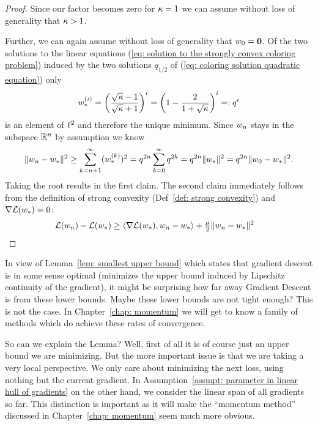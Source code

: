 \begin{proof}
	Since our factor becomes zero for \(\kappa=1\) we can assume without loss
	of generality that \(\kappa>1\).
	
	Further, we can again assume without loss of generality that
	\(w_0=\mathbf{0}\).  Of the two solutions to the linear equations
	(\ref{eq: solution to the strongly convex coloring problem}) induced by the
	two solutions \(q_{1/2}\) of (\ref{eq: coloring solution quadratic equation})
	only
	\begin{align*}
		w_*^{(i)} = \left(\frac{\sqrt{\kappa}-1}{\sqrt{\kappa}+1}\right)^i
		= \left(1 - \frac{2}{1+\sqrt{\kappa}}\right)^i =: q^i
	\end{align*}
	is an element of \(\ell^{2}\) and therefore the unique minimum. Since 
	\(w_n\) stays in the subspace \(\mathbb{R}^n\) by assumption we know
	\begin{align*}
		\|w_n -w_*\|^2
		\ge \sum_{k=n+1}^\infty (w_*^{(k)})^2
		= q^{2n} \sum_{k=0}^\infty q^{2k}
		= q^{2n} \| w_*\|^2
		= q^{2n} \|w_0 - w_*\|^2.
	\end{align*}
	Taking the root results in the first claim. The second claim immediately
	follows from the definition of strong convexity (Def~\ref{def: strong convexity})
	and \(\nabla\mathcal{L}(w_*) = 0\):
	\begin{align*}
		\mathcal{L}(w_n) - \mathcal{L}(w_*)
		&\ge \langle \nabla\mathcal{L}(w_*), w_n -w_*\rangle
		+\tfrac{\mu}{2} \|w_n -w_*\|^2
		\qedhere
	\end{align*}
\end{proof}

In view of Lemma~\ref{lem: smallest upper bound} which states that gradient
descent is in some sense optimal (minimizes the upper bound induced by
Lipschitz continuity of the gradient), it might be surprising how far away
Gradient Descent is from these lower bounds. Maybe these lower bounds are not
tight enough? This is not the case. In Chapter~\ref{chap: momentum} we will get
to know a family of methods which do achieve these rates of convergence.

So can we
explain the Lemma? Well, first of all it is of course just an upper bound we
are minimizing. But the more important issue is that we are taking a very
local perspective. We only care about minimizing the next loss, using 
nothing but the current gradient. In Assumption~\ref{assmpt: parameter in
linear hull of gradients} on the other hand, we consider the linear span of all
gradients so far. This distinction is important as it will make the
``momentum method'' discussed in Chapter~\ref{chap: momentum} seem much more obvious.

